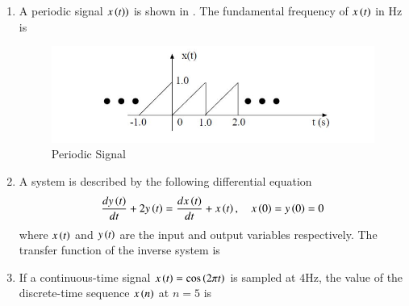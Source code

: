 \documentclass[journal,12pt,onecolumn]{IEEEtran}
\theoremstyle{remark}
\begin{document}
\begin{enumerate}
\item A periodic signal $x\left(t\right))$ is shown in . The fundamental frequency of $x\left(t\right)$ in Hz is \textemdash \textemdash \par \hfill{}
\begin{figure}[H]
    \centering
    \includegraphics[width=0.7\columnwidth]{Figs/Q-9.png}
    \caption{Periodic Signal}
    \label{fig:placeholder_5}
\end{figure}

\item A system is described by the following differential equation 
$$\frac{dy\left(t\right)}{dt} + 2y\left(t\right) = \frac{dx\left(t\right)}{dt} + x\left(t\right), \quad x\left(0\right) = y\left(0\right) = 0$$
where 
$x\left(t\right)$ and $y\left(t\right)$ are the input and output variables respectively. The transfer function of the inverse system is \par \hfill{}
\begin{enumerate}
\end{enumerate}

\item If a continuous-time signal $x\left(t\right) = \cos\left(2\pi t\right)$ is sampled at $4\text{Hz}$, the value of the discrete-time sequence $x\left(n\right)$ at $n=5$ is \par \hfill{}
\begin{enumerate}
\end{enumerate}


\end{enumerate}
\end{document}
